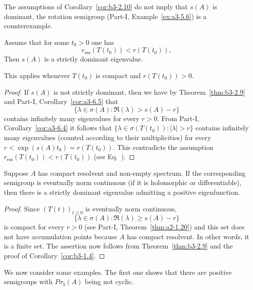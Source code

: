 The assumptions of Corollary~\ref{cor:b3-2.10} do not imply that $s(A)$ is dominant, the rotation semigroup (Part-I, Example~\ref{ex:a3-5.6}) is a counterexample.
\begin{corollary}\label{cor:b3-2.11}
	Assume that for some $t_{0} > 0$ one has 
    \[
    r_{\text{ess}}(T(t_{0})) < r(T(t_{0})), 
    \]
	Then $s(A)$ is a strictly dominant eigenvalue.

    This applies \eg whenever $T(t_{0})$ is compact and $r(T(t_{0})) > 0$.
\end{corollary}
\begin{proof}
	If\/ $s(A)$ is not strictly dominant, then we have by Theorem~\ref{thm:b3-2.9} and Part-I, Corollary~\ref{cor:a3-6.5} that 
    \[
    \{\lambda \in \sigma(A) \colon \Re(\lambda) > s(A) - r\}
    \]
    contains infinitely many eigenvalues for every $r > 0$.
	From Part-I, Corollary~\ref{cor:a3-6.4} it follows that $\{\lambda \in \sigma(T(t_{0})) \colon |\lambda| > r\}$ contains infinitely many eigenvalues (counted according to their multiplicities) for every $r < \exp(s(A)t_{0}) = r(T(t_{0}))$.
	This contradicts the assumption $r_{\text{ess}}(T(t_{0})) < r(T(t_{0}))$ (see Eq.~).
\end{proof}
\begin{corollary}\label{cor:b3-2.12}
	Suppose $A$ has compact resolvent and non-empty spectrum.
	If the corresponding semigroup is eventually norm continuous (\eg if it is holomorphic or differentiable), then there is a strictly dominant eigenvalue admitting a positive eigenfunction.
\end{corollary}
\begin{proof}
	Since $(T(t))_{t \geq 0}$ is eventually norm continuous, 
    \[
    \{\lambda \in \sigma(A) \colon \Re(\lambda) \geq s(A)-r\}
    \]
    is compact for every $r > 0$ (see Part-I, Theorem~\ref{thm:a2-1.20}) and this set does not have accumulation points because $A$ has compact resolvent.
	In other words, it is a finite set.
	The assertion now follows from Theorem~\ref{thm:b3-2.9} and the proof of Corollary~\ref{cor:b3-1.4}.
\end{proof}
We now consider some examples. 
The first one shows that there are positive semigroups with $P\sigma_{b}(A)$ being not cyclic.
